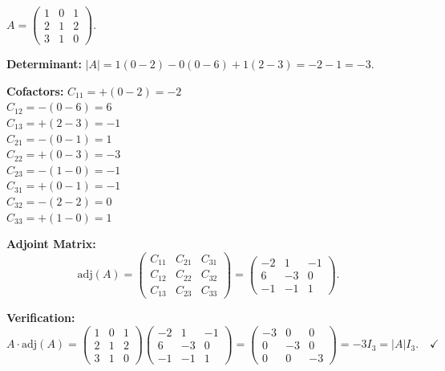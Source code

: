 \documentclass[12pt,a3paper]{article}
\begin{document}
\begin{tcolorbox}[enhanced,breakable,
  colback=cB!4,colframe=cB,boxrule=0.8pt,arc=5pt,
  title={\textbf{Answer --- Verify $A(\mathrm{adj}\,A)=|A|I_3$; Find $A^{-1}$}},
  fonttitle=\bfseries\color{white},colbacktitle=cB]

$A=\begin{pmatrix}1&0&1\\2&1&2\\3&1&0\end{pmatrix}$.

\textbf{Determinant:}
$|A|=1(0-2)-0(0-6)+1(2-3)=-2-1=-3$.

\textbf{Cofactors:}
$C_{11} = +(0-2) = -2$ \\
$C_{12} = -(0-6) = 6$ \\
$C_{13} = +(2-3) = -1$ \\
$C_{21} = -(0-1) = 1$ \\
$C_{22} = +(0-3) = -3$ \\
$C_{23} = -(1-0) = -1$ \\
$C_{31} = +(0-1) = -1$ \\
$C_{32} = -(2-2) = 0$ \\
$C_{33} = +(1-0) = 1$

\textbf{Adjoint Matrix:}
\[
\mathrm{adj}(A) = \begin{pmatrix} C_{11} & C_{21} & C_{31} \\ C_{12} & C_{22} & C_{32} \\ C_{13} & C_{23} & C_{33} \end{pmatrix} = \begin{pmatrix}-2&1&-1\\6&-3&0\\-1&-1&1\end{pmatrix}.
\]

\textbf{Verification:}
\[
A \cdot \mathrm{adj}(A) = \begin{pmatrix}1&0&1\\2&1&2\\3&1&0\end{pmatrix} \begin{pmatrix}-2&1&-1\\6&-3&0\\-1&-1&1\end{pmatrix} = \begin{pmatrix}-3&0&0\\0&-3&0\\0&0&-3\end{pmatrix} = -3I_3 = |A|I_3. \quad \checkmark
\]


\end{tcolorbox}
\end{document}

